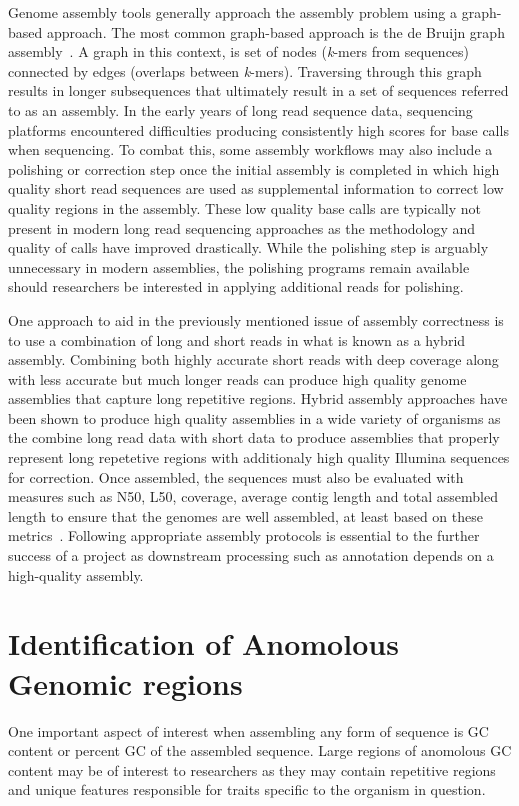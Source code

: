 Genome assembly tools generally approach the assembly problem using a
graph-based approach. The most common graph-based approach is the de
Bruijn graph assembly~\cite{compeau2011a}. A graph in this context, is
set of nodes (\textit{k}-mers from sequences) connected by edges
(overlaps between \textit{k}-mers). Traversing through this graph
results in longer subsequences that ultimately result in a set of
sequences referred to as an assembly. In the early years of long read
sequence data, sequencing platforms encountered difficulties producing
consistently high scores for base calls when sequencing. To combat
this, some assembly workflows may also include a polishing or
correction step once the initial assembly is completed in which high
quality short read sequences are used as supplemental information to
correct low quality regions in the assembly. These low quality base
calls are typically not present in modern long read sequencing
approaches as the methodology and quality of calls have improved
drastically. While the polishing step is arguably unnecessary in
modern assemblies, the polishing programs remain available should
researchers be interested in applying additional reads for polishing.

One approach to aid in the previously mentioned issue of assembly
correctness is to use a combination of long and short reads in what is
known as a hybrid assembly. Combining both highly accurate short reads
with deep coverage along with less accurate but much longer reads can
produce high quality genome assemblies that capture long repetitive
regions. Hybrid assembly approaches have been shown to produce high
quality assemblies in a wide variety of organisms as the combine long
read data with short data to produce assemblies that properly
represent long repetetive regions with additionaly high quality
Illumina sequences for correction. Once assembled, the sequences must
also be evaluated with measures such as N50, L50, coverage, average
contig length and total assembled length to ensure that the genomes
are well assembled, at least based on these
metrics~\cite{nagarajan2013a}. Following appropriate assembly protocols
is essential to the further success of a project as downstream
processing such as annotation depends on a high-quality assembly.

\section{Identification of Anomolous Genomic regions}
One important aspect of interest when assembling any form of sequence
is GC content or percent GC of the assembled sequence. Large regions
of anomolous GC content may be of interest to researchers as they may
contain repetitive regions and unique features responsible for traits
specific to the organism in question.



